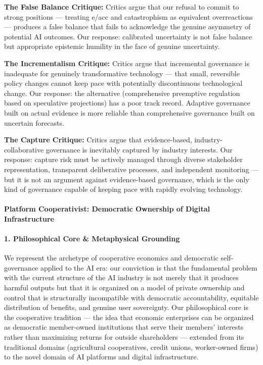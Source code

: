 \textbf{The False Balance Critique:} Critics argue that our refusal to
commit to strong positions --- treating e/acc and catastrophism as
equivalent overreactions --- produces a false balance that fails to
acknowledge the genuine asymmetry of potential AI outcomes. Our
response: calibrated uncertainty is not false balance but appropriate
epistemic humility in the face of genuine uncertainty.

\textbf{The Incrementalism Critique:} Critics argue that incremental
governance is inadequate for genuinely transformative technology ---
that small, reversible policy changes cannot keep pace with potentially
discontinuous technological change. Our response: the alternative
(comprehensive preemptive regulation based on speculative projections)
has a poor track record. Adaptive governance built on actual evidence is
more reliable than comprehensive governance built on uncertain
forecasts.

\textbf{The Capture Critique:} Critics argue that evidence-based,
industry-collaborative governance is inevitably captured by industry
interests. Our response: capture risk must be actively managed through
diverse stakeholder representation, transparent deliberative processes,
and independent monitoring --- but it is not an argument against
evidence-based governance, which is the only kind of governance capable
of keeping pace with rapidly evolving technology.

\paragraph{Platform Cooperativist: Democratic Ownership of Digital
Infrastructure}\label{platform-cooperativist-democratic-ownership-of-digital-infrastructure}

\paragraph{1. Philosophical Core \& Metaphysical
Grounding}\label{philosophical-core-metaphysical-grounding-30}

We represent the archetype of cooperative economics and democratic
self-governance applied to the AI era: our conviction is that the
fundamental problem with the current structure of the AI industry is not
merely that it produces harmful outputs but that it is organized on a
model of private ownership and control that is structurally incompatible
with democratic accountability, equitable distribution of benefits, and
genuine user sovereignty. Our philosophical core is the cooperative
tradition --- the idea that economic enterprises can be organized as
democratic member-owned institutions that serve their members' interests
rather than maximizing returns for outside shareholders --- extended
from its traditional domains (agricultural cooperatives, credit unions,
worker-owned firms) to the novel domain of AI platforms and digital
infrastructure.

